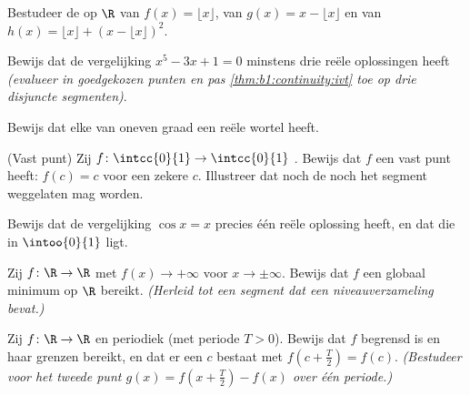\begin{exercise}[$\star$]\label{exo:b1:continuity:2}
Bestudeer de  op $\R$ van $f(x) = \lfloor x \rfloor$, van
$g(x) = x - \lfloor x \rfloor$ en van $h(x) = \lfloor x \rfloor + (x -
\lfloor x\rfloor)^2$.
\end{exercise}

\begin{exercise}[$\star$]\label{exo:b1:continuity:3}
Bewijs dat de vergelijking $x^5 - 3x + 1 = 0$ minstens drie reële
oplossingen heeft \emph{(evalueer in goedgekozen punten en pas
\cref{thm:b1:continuity:ivt} toe op drie disjuncte segmenten)}.
\end{exercise}

\begin{exercise}[$\star$]\label{exo:b1:continuity:4}
Bewijs dat elke  van oneven graad een reële wortel heeft.
\end{exercise}

\begin{exercise}[$\star\star$]\label{exo:b1:continuity:5}
(Vast punt) Zij $f \colon \intcc{0}{1} \to \intcc{0}{1}$ . Bewijs
dat $f$ een vast punt heeft: $f(c) = c$ voor een zekere $c$. Illustreer
dat noch de  noch het segment weggelaten mag worden.
\end{exercise}

\begin{exercise}[$\star\star$]\label{exo:b1:continuity:6}
Bewijs dat de vergelijking $\cos x = x$ precies één reële oplossing
heeft, en dat die in $\intoo{0}{1}$ ligt.
\end{exercise}

\begin{exercise}[$\star\star$]\label{exo:b1:continuity:7}
Zij $f \colon \R \to \R$  met $f(x) \to +\infty$ voor $x \to
\pm\infty$. Bewijs dat $f$ een globaal minimum op $\R$ bereikt.
\emph{(Herleid tot een segment dat een niveauverzameling bevat.)}
\end{exercise}

\begin{exercise}[$\star\star$]\label{exo:b1:continuity:8}
Zij $f \colon \R \to \R$  en periodiek (met periode $T > 0$).
Bewijs dat $f$ begrensd is en haar grenzen bereikt, en dat er een $c$
bestaat met $f(c + \frac T2) = f(c)$. \emph{(Bestudeer voor het tweede
punt $g(x) = f(x + \frac T2) - f(x)$ over één periode.)}
\end{exercise}

